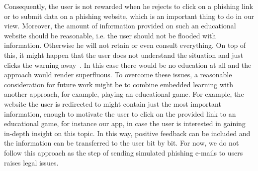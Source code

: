 Consequently, the user is not rewarded when he rejects to click on a phishing link or to submit data on a phishing website, which is an important thing to do in our view. 
Moreover, the amount of information provided on such an educational website should be reasonable, i.e. the user should not be flooded with information. 
Otherwise he will not retain or even consult everything. 
On top of this, it might happen that the user does not understand the situation and just clicks the warning away~\cite{TUD-CS-2013-0167}.
In this case there would be no education at all and the approach would render superfluous.
To overcome these issues, a reasonable consideration for future work might be to combine embedded learning with another approach, for example, playing an educational game. 
For example, the website the user is redirected to might contain just the most important information, enough to motivate the user to click on the provided link to an educational game, for instance our app, in case the user is interested in gaining in-depth insight on this topic. 
In this way, positive feedback can be included and the information can be transferred to the user bit by bit. 
For now, we do not follow this approach as the step of sending simulated phishing e-mails to users raises legal issues.

